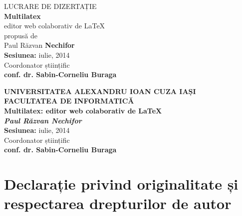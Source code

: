 \documentclass[a4wide,12pt]{report}
\newcommand{\subtitlu}{editor web colaborativ de \LaTeX}
\newcommand{\titlu}{Multilatex: \subtitlu}
\newcommand{\autor}{Paul Răzvan Nechifor} %
\newcommand{\coordonator}{conf. dr. Sabin-Corneliu Buraga}
\newcommand{\sesiunea}{iulie, 2014}
\begin{document}
\begin{center}
    \centering
    \color{white}
    {\fontsize{22}{26}\selectfont \textsf{LUCRARE DE DIZERTAȚIE}}\\
    \vspace{1.5cm}
    {\fontsize{40}{46}\selectfont \textsf{\textbf{Multilatex}}}\\
    \vspace{0.5cm}
    {\fontsize{26}{28}\selectfont \textsf{\subtitlu}}\\
    \vspace{1.5cm}
    \large{\textsf{propusă de}}\\
    \vspace{1.5cm}
    {\fontsize{26}{28}\selectfont \textsf{Paul Răzvan \textbf{Nechifor}}}\\
    \vspace{1.5cm}
    {\fontsize{16}{26}\selectfont \textsf{\textbf{Sesiunea:} \sesiunea}}\\
    \vspace{1.5cm}
    {\fontsize{14}{26}\selectfont \textsf{Coordonator științific}}\\
    {\fontsize{18}{26}\selectfont \textsf{\textbf{\coordonator}}}\\
\end{center}

\pagebreak

\begin{center}
    \textbf{UNIVERSITATEA ALEXANDRU IOAN CUZA IAȘI}\\
    \vspace{3mm}
    \textbf{FACULTATEA DE INFORMATICĂ}\\
    \vspace{89mm}
    \Huge{\textbf{\titlu}}\\
    \vspace{30mm}
    \Large{\textbf{\emph{\autor}}}\\
    \vspace{11mm}
    \Large{\textbf{Sesiunea:} \sesiunea}\\
    \vspace{10mm}
    \normalsize{Coordonator științific}\\
    \vspace{3mm}
    \large{\textbf{\coordonator}}\\
    \end{center}
\pagebreak

\section*{Declarație privind originalitate și respectarea drepturilor de autor}
\end{document}

